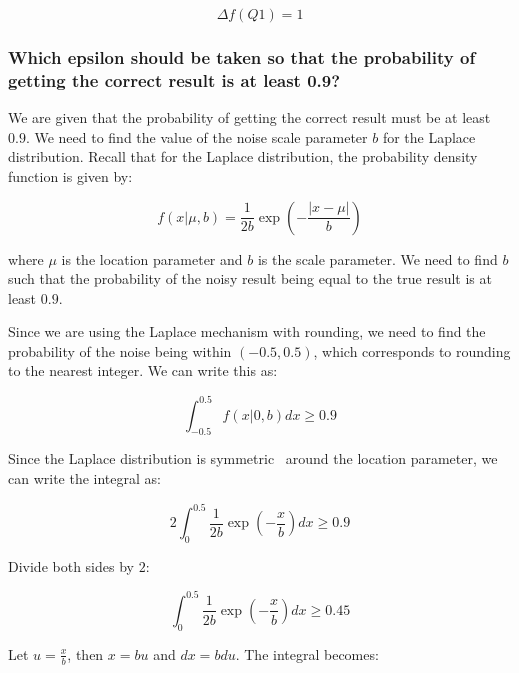 \begin{equation}
  \Delta f(Q1) = 1
\end{equation}





\subsubsection{Which epsilon should be taken so that the probability of getting the correct result is at
least 0.9?}

  We are given that the probability of getting the correct result must be at least $0.9$. We need to find the value of the noise scale parameter $b$ for the Laplace distribution. Recall that for the Laplace distribution, the probability density function is given by:

  \begin{equation}
    f(x|\mu, b) = \frac{1}{2b} \exp\left(-\frac{|x - \mu|}{b}\right)
  \end{equation}

  where $\mu$ is the location parameter and $b$ is the scale parameter. We need to find $b$ such that the probability of the noisy result being equal to the true result is at least $0.9$.

  Since we are using the Laplace mechanism with rounding, we need to find the probability of the noise being within $(-0.5, 0.5)$, which corresponds to rounding to the nearest integer. We can write this as:

  \begin{equation}
    \int_{-0.5}^{0.5} f(x|0, b) dx \geq 0.9
  \end{equation}

  Since the Laplace distribution is symmetric~\cite[294]{laplance} around the location parameter, we can write the integral as:

  \begin{equation}
    2 \int_0^{0.5} \frac{1}{2b} \exp\left(-\frac{x}{b}\right) dx \geq 0.9
  \end{equation}

  Divide both sides by $2$:

  \begin{equation}
    \int_0^{0.5} \frac{1}{2b} \exp\left(-\frac{x}{b}\right) dx \geq 0.45
  \end{equation}

  Let $u = \frac{x}{b}$, then $x = bu$ and $dx = bdu$. The integral becomes:

